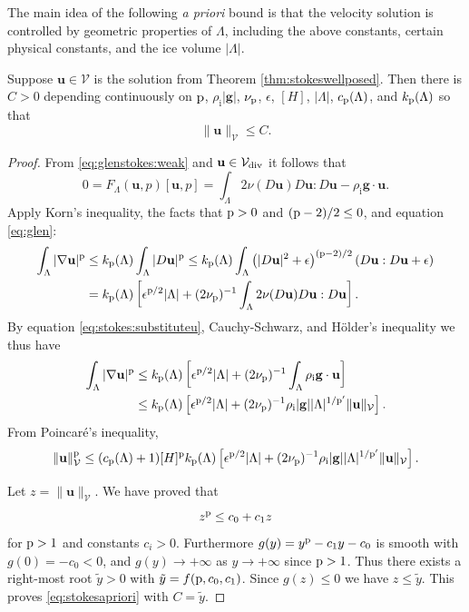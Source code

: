 \documentclass[hidelinks,onefignum,onetabnum,final]{siamart220329}  %
\newcommand{\eps}{\epsilon}
\newcommand{\grad}{\nabla}
\newcommand{\bg}{\mathbf{g}}
\newcommand{\bu}{\mathbf{u}}
\newcommand{\cV}{\mathcal{V}}
\newcommand{\pp}{{\text{\textnormal{p}}}}
\newcommand{\rhoi}{\rho_{\text{i}}}
\newcommand{\Vdiv}{\cV_{\text{\textnormal{div}}}}
\begin{document}
The main idea of the following \emph{a priori} bound is that the velocity solution is controlled by geometric properties of $\Lambda$, including the above constants, certain physical constants, and the ice volume $|\Lambda|$.

\begin{lemma} \label{lem:stokesapriori}
Suppose $\bu\in\cV$ is the solution from Theorem \ref{thm:stokeswellposed}.  Then there is $C>0$ depending continuously on $\pp$, $\rhoi |\bg|$, $\nu_\pp$, $\eps$, $[H]$, $|\Lambda|$, $c_\pp(\Lambda)$, and $k_\pp(\Lambda)$ so that
\begin{equation}
\|\bu\|_{\cV} \le C. \label{eq:stokesapriori}
\end{equation}
\end{lemma}

\begin{proof}
From \eqref{eq:glenstokes:weak} and $\bu \in\Vdiv$ it follows that
\begin{equation}
0= F_\Lambda(\bu,p)[\bu,p] = \int_\Lambda 2 \nu(D\bu) D\bu : D\bu - \rhoi \bg \cdot \bu.  \label{eq:stokes:substituteu}
\end{equation}
Apply Korn's inequality, the facts that $\pp>0$ and $(\pp-2)/2 \le 0$, and equation \eqref{eq:glen}:
\begin{align}
\int_\Lambda |\grad\bu|^\pp &\le k_{\pp}(\Lambda) \int_\Lambda |D\bu|^\pp \le k_{\pp}(\Lambda) \int_\Lambda \left(|D\bu|^2 + \eps\right)^{(\pp-2)/2} \left(D\bu:D\bu + \eps\right) \label{eq:stokes:startapriori} \\
	&= k_{\pp}(\Lambda) \left[\eps^{\pp/2} |\Lambda| + (2 \nu_\pp)^{-1} \int_\Lambda 2\nu(D\bu) D\bu:D\bu\right]. \notag
\end{align}
By equation \eqref{eq:stokes:substituteu}, Cauchy-Schwarz, and H\"older's inequality we thus have
\begin{align}
\int_\Lambda |\grad\bu|^\pp &\le k_{\pp}(\Lambda) \left[\eps^{\pp/2} |\Lambda| + (2 \nu_\pp)^{-1} \int_\Lambda \rhoi \bg \cdot \bu\right] \label{eq:stokes:workapriori} \\
	&\le k_{\pp}(\Lambda) \left[\eps^{\pp/2} |\Lambda| + (2 \nu_\pp)^{-1} \rhoi |\bg| |\Lambda|^{1/\pp'} \|\bu\|_\cV\right]. \notag
\end{align}
From Poincar\'e's inequality,
\begin{equation}
\|\bu\|_{\cV}^\pp \le (c_{\pp}(\Lambda) + 1) [H]^\pp k_{\pp}(\Lambda) \left[\eps^{\pp/2} |\Lambda| + (2 \nu_\pp)^{-1} \rhoi |\bg| |\Lambda|^{1/\pp'} \|\bu\|_\cV\right].
\end{equation}

Let $z=\|\bu\|_\cV$.  We have proved that
\begin{equation}
z^\pp \le c_0 + c_1 z
\end{equation}
for $\pp>1$ and constants $c_i>0$.  Furthermore $g(y) = y^\pp - c_1 y - c_0$ is smooth with $g(0)=-c_0<0$, and $g(y) \to +\infty$ as $y \to +\infty$ since $\pp>1$.  Thus there exists a right-most root $\tilde y>0$ with $\tilde y = f(\pp,c_0,c_1)$.  Since $g(z)\le 0$ we have $z \le \tilde y$.  This proves \eqref{eq:stokesapriori} with $C=\tilde y$.
\end{proof}
\end{document}
